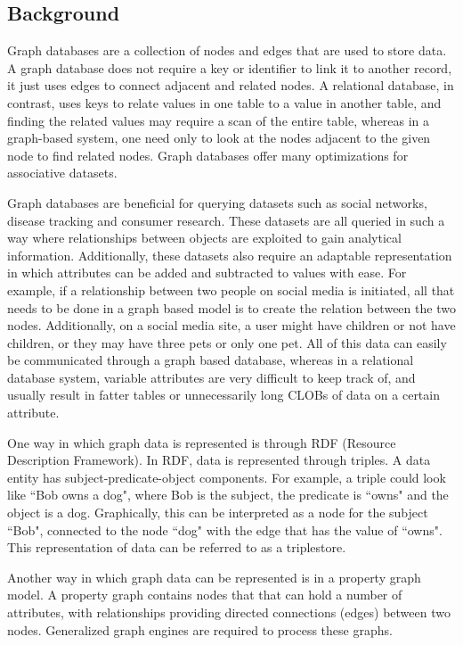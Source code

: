 \subsection*{Background}


Graph databases are a collection of nodes and edges that are used to store data. A graph database does not require a key or identifier to link it to another record, it just uses edges to connect adjacent and related nodes. A relational database, in contrast, uses keys to relate values in one table to a value in another table, and finding the related values may require a scan of the entire table, whereas in a graph-based system, one need only to look at the nodes adjacent to the given node to find related nodes. Graph databases offer many optimizations for associative datasets.


Graph databases are beneficial for querying datasets such as social networks, disease tracking and consumer research. These datasets are all queried in such a way where relationships between objects are exploited to gain analytical information. Additionally, these datasets also require an adaptable representation in which attributes can be added and subtracted to values with ease. For example, if a relationship between two people on social media is initiated, all that needs to be done in a graph based model is to create the relation between the two nodes. Additionally, on a social media site, a user might have children or not have children, or they may have three pets or only one pet. All of this data can easily be communicated through a graph based database, whereas in a relational database system, variable attributes are very difficult to keep track of, and usually result in fatter tables or unnecessarily long CLOBs of data on a certain attribute.



One way in which graph data is represented is through RDF (Resource Description Framework). In RDF, data is represented through triples. A data entity has subject-predicate-object components\cite{RDF}.
For example, a triple could look like ``Bob owns a dog", where Bob is the subject, the predicate is ``owns" and the object is a dog.
Graphically, this can be interpreted as a node for the subject ``Bob", connected to the node ``dog" with the edge that has the value of ``owns". This representation of data can be referred to as a triplestore.


Another way in which graph data can be represented is in a property graph model. A property graph contains nodes that that can hold a number of attributes, with relationships providing directed connections (edges) between two nodes\cite{neoj4}. Generalized graph engines are required to process these graphs. 


